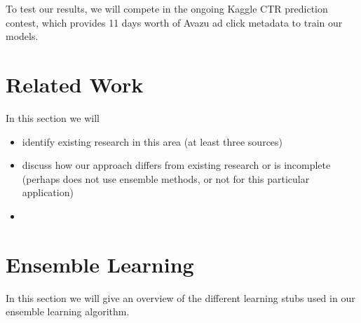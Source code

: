 \documentclass{article} %
\begin{document}
To test our results, we will compete in the ongoing Kaggle CTR prediction contest, which provides 11 days worth of Avazu ad click metadata to train our models.



\section{Related Work}
\label{gen_inst}

In this section we will

\begin{itemize}
\item identify existing research in this area (at least three sources)
\item discuss how our approach differs from existing research or is incomplete (perhaps does not use ensemble methods, or not for this particular application)
\item 

\end{itemize}

\section{Ensemble Learning}

In this section we will give an overview of the different learning stubs used in our ensemble learning algorithm.
\end{document}
